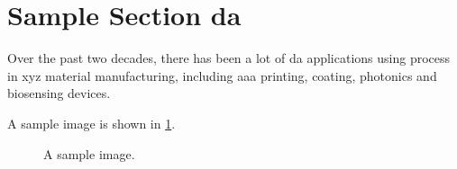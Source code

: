 \section{Sample Section \gls{da}}
\label{intro:sample_section}

Over the past two decades, there has been a lot of \gls{da} applications using process in \gls{xyz} material manufacturing, including \gls{aaa} printing, coating, photonics and biosensing devices.

A sample image is shown in \ref{fig:sample_image_purple}.~\cite{Bla}

\begin{figure}[!htb]
	\caption{A sample image.}
	\label{fig:sample_image_purple}
\end{figure}


